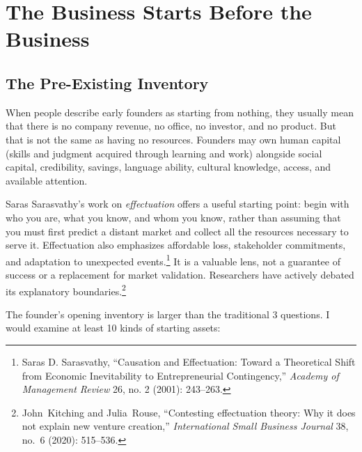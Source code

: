 \section{The Business Starts Before the Business}

\subsection{The Pre-Existing Inventory}

When people describe early founders as starting from nothing, they usually mean that there is no company revenue, no office, no investor, and no product. But that is not the same as having no resources. Founders may own human capital (skills and judgment acquired through learning and work) alongside social capital, credibility, savings, language ability, cultural knowledge, access, and available attention.

Saras Sarasvathy's work on \textit{effectuation} offers a useful starting point: begin with who you are, what you know, and whom you know, rather than assuming that you must first predict a distant market and collect all the resources necessary to serve it. Effectuation also emphasizes affordable loss, stakeholder commitments, and adaptation to unexpected events.\footnote{Saras D. Sarasvathy, ``Causation and Effectuation: Toward a Theoretical Shift from Economic Inevitability to Entrepreneurial Contingency,'' \textit{Academy of Management Review} 26, no. 2 (2001): 243--263.} It is a valuable lens, not a guarantee of success or a replacement for market validation. Researchers have actively debated its explanatory boundaries.\footnote{John~Kitching and Julia~Rouse, ``Contesting effectuation theory: Why it does not explain new venture creation,'' \textit{International Small Business Journal} 38, no.~6 (2020): 515--536.}

The founder's opening inventory is larger than the traditional 3 questions. I would examine at least 10 kinds of starting assets:

